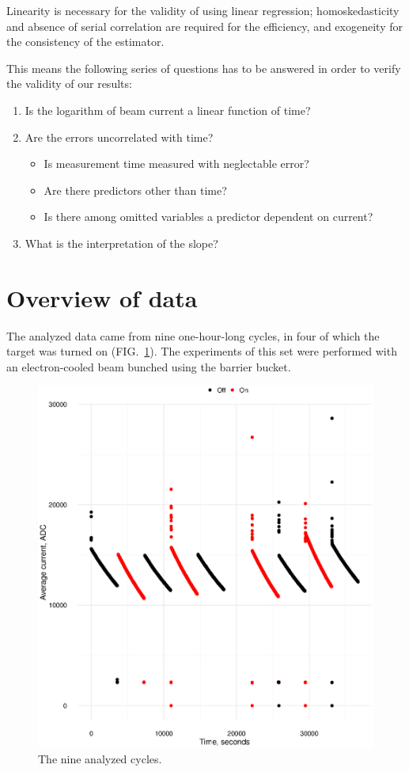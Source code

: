 \documentclass[reprint]{revtex4-1}
\newcommand{\scl}{.39}
\begin{document}
Linearity is necessary for the validity of using linear regression; homoskedasticity and absence of serial correlation are required for the efficiency, and exogeneity for the consistency of the estimator.

This means the following series of questions has to be answered in order to verify the validity of our results:
\begin{enumerate}
	\item Is the logarithm of beam current a linear function of time?
	\item Are the errors uncorrelated with time?
		\begin{itemize}
			\item Is measurement time measured with neglectable error?
			\item Are there predictors other than time?
			\item Is there among omitted variables a predictor dependent on current?
		\end{itemize}
	\item What is the interpretation of the slope?
\end{enumerate}


\section{Overview of data}
The analyzed data came from nine one-hour-long cycles, in four of which the target was turned on (FIG.~\ref{fig:TheNine}). The experiments of this set were performed with an electron-cooled beam bunched using the barrier bucket.

\begin{figure}[h]
\includegraphics[scale=\scl]{img/TheNineCycles.eps}
\caption{The nine analyzed cycles.\label{fig:TheNine}}
\end{figure} 
\end{document}
